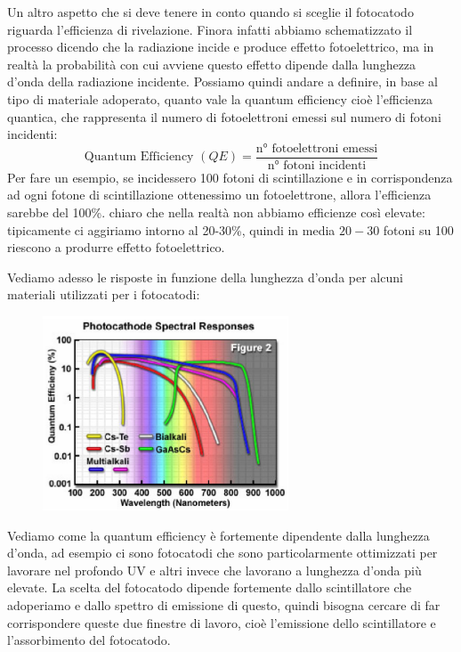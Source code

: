Un altro aspetto che si deve tenere in conto quando si sceglie il fotocatodo riguarda l'efficienza di rivelazione. Finora infatti abbiamo schematizzato il processo dicendo che la radiazione incide e produce effetto fotoelettrico, ma in realtà la probabilità con cui avviene questo effetto dipende dalla lunghezza d'onda della radiazione incidente. Possiamo quindi andare a definire, in base al tipo di materiale adoperato, quanto vale la quantum efficiency cioè l'efficienza quantica, che rappresenta il numero di fotoelettroni emessi sul numero di fotoni incidenti:
\begin{equation*}
   \text{Quantum Efficiency }(QE)
   =\frac{\text{n° fotoelettroni emessi}}{\text{n° fotoni incidenti}}
\end{equation*}
Per fare un esempio, se incidessero 100 fotoni di scintillazione e in corrispondenza ad ogni fotone di scintillazione ottenessimo un fotoelettrone, allora l'efficienza sarebbe del 100\%. \E chiaro che nella realtà non abbiamo efficienze così elevate: tipicamente ci aggiriamo intorno al 20-30\%, quindi in media $20-30$ fotoni su 100 riescono a produrre effetto fotoelettrico.

Vediamo adesso le risposte in funzione della lunghezza d'onda per alcuni materiali utilizzati per i fotocatodi:
\begin{figure}[H]
   \centering
   \includegraphics[width=0.65\textwidth]{immagini/efficienza_quantica.png}
\end{figure}
Vediamo come la quantum efficiency è fortemente dipendente dalla lunghezza d'onda, ad esempio ci sono fotocatodi che sono particolarmente ottimizzati per lavorare nel profondo UV e altri invece che lavorano a lunghezza d'onda più elevate. La scelta del fotocatodo dipende fortemente dallo scintillatore che adoperiamo e dallo spettro di emissione di questo, quindi bisogna cercare di far corrispondere queste due finestre di lavoro, cioè l'emissione dello scintillatore e l'assorbimento del fotocatodo.

